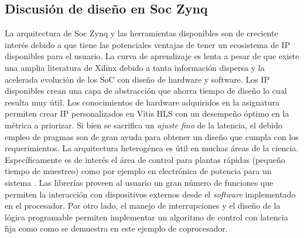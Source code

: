 \documentclass[conference]{IEEEtran}
\begin{document}
\subsection{Discusión de diseño en Soc Zynq}
La arquitectura de Soc Zynq y las herramientas disponibles son de creciente interés debido a  que tiene las potenciales ventajas de tener un ecosistema de IP disponibles para el usuario. La curva de aprendizaje es lenta a pesar de que existe una amplia literatura de Xilinx debido a tanta información dispersa y la acelerada evolución de los SoC con diseño de hardware y software. Los IP disponibles crean una capa de abstracción que ahorra tiempo de diseño  lo cual resulta muy útil. Los conocimientos de hardware adquiridos en la asignatura permiten crear IP personalizados en Vitis HLS con un desempeño óptimo en la métrica a priorizar. Si bien se sacrifica un \textit{ajuste fino} de la latencia, el debido empleo de pragmas son de gran ayuda para obtener un diseño que cumpla con los requerimientos. La arquitectura heterogénea es útil en muchas áreas de la ciencia. Específicamente es de interés el área de control para plantas rápidas (pequeño tiempo de muestreo) como por ejemplo en electrónica de potencia para un sistema . Las librerías proveen al usuario un gran número de funciones  que permiten la interacción con dispositivos externos desde el \textit{software} implementado en el procesador. Por otro lado, el manejo de interrupciones y el diseño de la lógica programable permiten implementar un algoritmo de control con latencia fija como como se demuestra en este ejemplo de coprocesador.    
\end{document}
